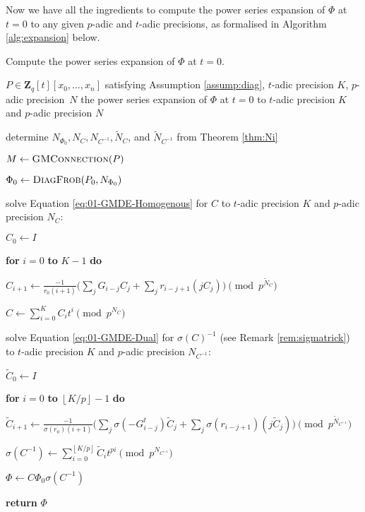\documentclass[a4paper,11pt]{article}
\numberwithin{equation}{section}
\providecommand{\floor}[1]{\left\lfloor#1\right\rfloor}   %
\newcommand{\ZZ}{\mathbf{Z}} %
\theoremstyle{definition}
\begin{document}
Now we have all the ingredients to compute the power series expansion of $\Phi$ at $t=0$ to any 
given $p$-adic and $t$-adic precisions, as formalised in Algorithm \ref{alg:expansion} below.

\begin{algorithm}
\caption{Compute the power series expansion of $\Phi$ at $t=0$.}
\label{alg:expansion}
\begin{algorithmic}
\vspace{1mm}
\Require $P \in \ZZ_q[t][x_0,\ldots,x_n]$ satisfying Assumption \ref{assump:diag}, $t$-adic precision $K$, $p$-adic precision~$N$
\Ensure  the power series expansion of $\Phi$ at $t=0$ to $t$-adic precision $K$ and $p$-adic precision $N$
\State \begin{compactenum}[{\hspace{6pt}} 1.] \vspace{-1.24em}
\item determine $N_{\Phi_0},N_C,N_{C^{-1}},\tilde{N}_C$, and $\tilde{N}_{C^{-1}}$ from Theorem \ref{thm:Ni}
\item $M \gets \textsc{GMConnection}(P)$
\item $\Phi_0 \gets \textsc{DiagFrob}(P_0,N_{\Phi_0})$
\item solve Equation \eqref{eq:01-GMDE-Homogenous} for $C$ to $t$-adic precision $K$ and $p$-adic precision $N_{C}$:
\begin{compactenum}[a.] 
\item[] $C_0 \gets I$
\item[] \textbf{for} $i=0$ \textbf{to} $K-1$ \textbf{do} 
\item[] \hspace{0.6em} $C_{i+1} \gets \frac{-1}{r_0 (i+1)} \biggl(\sum_j G_{i-j} C_j + \sum_j r_{i-j+1} (j C_j) \biggr) \pmod{p^{\tilde{N}_C}}$
\item[] $C \gets \sum_{i=0}^K C_i t^i \pmod{p^{N_C}}$
\end{compactenum}
\item solve Equation \eqref{eq:01-GMDE-Dual} for $\sigma(C)^{-1}$ (see Remark \ref{rem:sigmatrick}) to $t$-adic precision $K$ and $p$-adic precision $N_{C^{-1}}$:
\begin{compactenum}[a.]
\item[] $\tilde{C}_0 \gets I$
\item[] \textbf{for} $i=0$ \textbf{to} $\floor{K/p}-1$ \textbf{do}
\item[] \hspace{0.6em} $\tilde{C}_{i+1} \gets  \frac{-1}{\sigma(r_0)(i+1)} \biggl(\sum_j \sigma(-G_{i-j}^t) \tilde{C}_j + \sum_j \sigma(r_{i-j+1}) (j \tilde{C}_j) \biggr) \pmod{p^{\tilde{N}_{C^{-1}}}}$
\item[] $\sigma(C^{-1}) \gets \sum_{i=0}^{\floor{K/p}} \tilde{C}_i t^{pi} \pmod{p^{N_{C^{-1}}}}$
\end{compactenum}
\item $\Phi \gets C \Phi_0 \sigma(C^{-1})$
\item \textbf{return} $\Phi$
\end{compactenum}
\EndProcedure
\end{algorithmic}
\end{algorithm}
\end{document}
